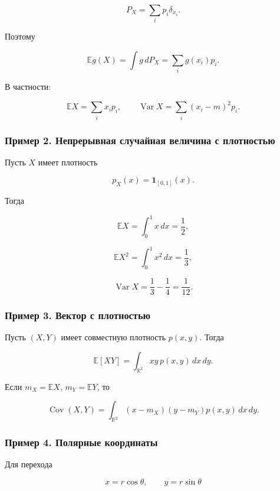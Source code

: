 \documentclass[
  11pt,
  a4paper,
]{article}
\begin{document}
\[
P_X=\sum_i p_i\delta_{x_i}.
\]

Поэтому

\[
\mathbb E g(X)=\int g\,dP_X=\sum_i g(x_i)p_i.
\]

В частности:

\[
\mathbb EX=\sum_i x_i p_i,
\qquad
\operatorname{Var}X=\sum_i(x_i-m)^2p_i.
\]

\subsubsection{Пример 2. Непрерывная случайная величина с
плотностью}\label{ux43fux440ux438ux43cux435ux440-2.-ux43dux435ux43fux440ux435ux440ux44bux432ux43dux430ux44f-ux441ux43bux443ux447ux430ux439ux43dux430ux44f-ux432ux435ux43bux438ux447ux438ux43dux430-ux441-ux43fux43bux43eux442ux43dux43eux441ux442ux44cux44e}

Пусть \(X\) имеет плотность

\[
p_X(x)=\mathbf 1_{[0,1]}(x).
\]

Тогда

\[
\mathbb EX=\int_0^1 x\,dx=\frac12,
\]

\[
\mathbb EX^2=\int_0^1 x^2\,dx=\frac13,
\]

\[
\operatorname{Var}X=\frac13-\frac14=\frac1{12}.
\]

\subsubsection{Пример 3. Вектор с
плотностью}\label{ux43fux440ux438ux43cux435ux440-3.-ux432ux435ux43aux442ux43eux440-ux441-ux43fux43bux43eux442ux43dux43eux441ux442ux44cux44e}

Пусть \((X,Y)\) имеет совместную плотность \(p(x,y)\). Тогда

\[
\mathbb E[XY]
=
\int_{\mathbb R^2}xy\,p(x,y)\,dx\,dy.
\]

Если \(m_X=\mathbb EX\), \(m_Y=\mathbb EY\), то

\[
\operatorname{Cov}(X,Y)
=
\int_{\mathbb R^2}(x-m_X)(y-m_Y)p(x,y)\,dx\,dy.
\]

\subsubsection{Пример 4. Полярные
координаты}\label{ux43fux440ux438ux43cux435ux440-4.-ux43fux43eux43bux44fux440ux43dux44bux435-ux43aux43eux43eux440ux434ux438ux43dux430ux442ux44b}

Для перехода

\[
x=r\cos\theta,\qquad y=r\sin\theta
\]
\end{document}
